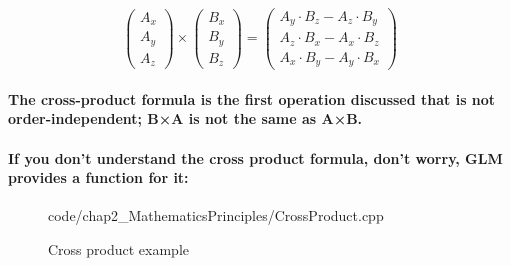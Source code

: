 \paragraph{
    \begin{equation}
    \begin{pmatrix}
    A_{x}\\
    A_{y}\\
    A_{z}
    \end{pmatrix} \times \begin{pmatrix}
    B_{x}\\
    B_{y}\\
    B_{z}
    \end{pmatrix} =\begin{pmatrix}
    A_{y} \cdot B_{z} -A_{z} \cdot B_{y}\\
    A_{z} \cdot B_{x} -A_{x} \cdot B_{z}\\
    A_{x} \cdot B_{y} -A_{y} \cdot B_{x}
    \end{pmatrix}
    \end{equation}
}

\paragraph{
The cross-product formula is the first operation discussed that is not order-independent; B×A is not the same as A×B.
}

\paragraph{
If you don't understand the cross product formula, don't worry, GLM provides a function for it:
}

\begin{frame}{}
    \begin{figure}[ht]
    \centering
    \colorbox{backgroundcolor}{
        \parbox{0.9\textwidth}{
            
            {code/chap2_MathematicsPrinciples/CrossProduct.cpp}
        }
    }
    \caption{Cross product example}
    \label{fig:cross_product_example}
    \end{figure}
\end{frame}
